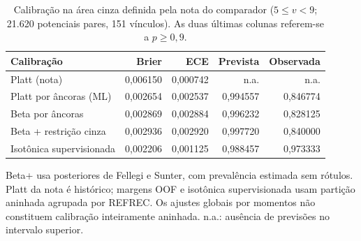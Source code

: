 \begin{table}[!ht]
\centering
\footnotesize
\caption{Calibração na área cinza definida pela nota do comparador ($5\leq v<9$; 21.620 potenciais pares, 151 vínculos). As duas últimas colunas referem-se a $p\geq0{,}9$.}
\label{tab:cap8-ancoras-beta}
\begin{tabular}{lrrrr}
\toprule
Calibração & Brier & ECE & Prevista & Observada \\
\midrule
Platt (nota) & 0,006150 & 0,000742 & n.a. & n.a. \\
Platt por âncoras (ML) & 0,002654 & 0,002537 & 0,994557 & 0,846774 \\
Beta por âncoras & 0,002869 & 0,002884 & 0,996232 & 0,828125 \\
Beta + restrição cinza & 0,002936 & 0,002920 & 0,997720 & 0,840000 \\
Isotônica supervisionada & 0,002206 & 0,001125 & 0,988457 & 0,973333 \\
\bottomrule
\end{tabular}
\par\smallskip
\parbox{\linewidth}{\footnotesize Beta+ usa posteriores de Fellegi e Sunter, com prevalência estimada sem rótulos. Platt da nota é histórico; margens OOF e isotônica supervisionada usam partição aninhada agrupada por REFREC. Os ajustes globais por momentos não constituem calibração inteiramente aninhada. n.a.: ausência de previsões no intervalo superior.}
\end{table}
